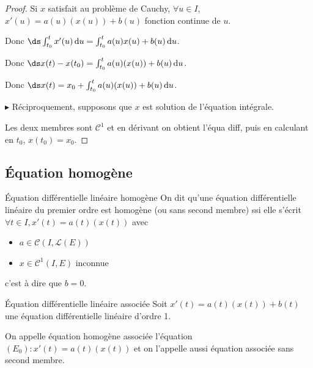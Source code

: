 \begin{proof}
    Si $x$ satisfait au problème de Cauchy, $\forall u \in I$, 
    $x'(u) = a(u)(x(u)) + b(u)$ fonction continue de $u$. 

    Donc $\ds \int_{t_0}^{t } x'(u) \, \mathrm d u = \int_{t_0}^{t} a(u)x(u) + b(u) \, \mathrm d u$.

    Donc $\ds x(t) - x(t_0) = \int_{t_0}^{t} a(u)(x(u)) + b(u) \, \mathrm d u$.

    Donc $\ds x(t) = x_0 + \int_{t_0}^{t} a(u)(x(u)) + b(u) \, \mathrm d u$.

    \avspace $\blacktriangleright$ Réciproquement, supposons que $x$ est solution de l'équation intégrale.

    Les deux membres sont $\mathscr C^1$ et en dérivant on obtient l'équa diff, puis en 
    calculant en $t_0$, $x(t_0) = x_0$.
\end{proof}

\subsection{\'Equation homogène}

\begin{definition}{\'Equation différentielle linéaire homogène}{}
    On dit qu'une équation différentielle linéaire du premier ordre est homogène (ou sans second membre)
    ssi elle s'écrit $\forall t \in I, x'(t) = a(t)(x(t))$ avec 

    \begin{itemize}
        \item $a \in \mathscr C(I, \mathscr L(E))$
        \item $x \in \mathscr C^1(I, E)$ inconnue
    \end{itemize}

    c'est à dire que $b = 0$. 
\end{definition}


\begin{definition}{\'Equation différentielle linéaire associée}{}
    Soit $x'(t) = a(t)(x(t)) + b(t)$ une équation différentielle linéaire d'ordre 1. 

    On appelle équation homogène associée l'équation 
    $(E_0) : x'(t) = a(t)(x(t))$ et on l'appelle aussi équation associée sans second membre.
\end{definition}

